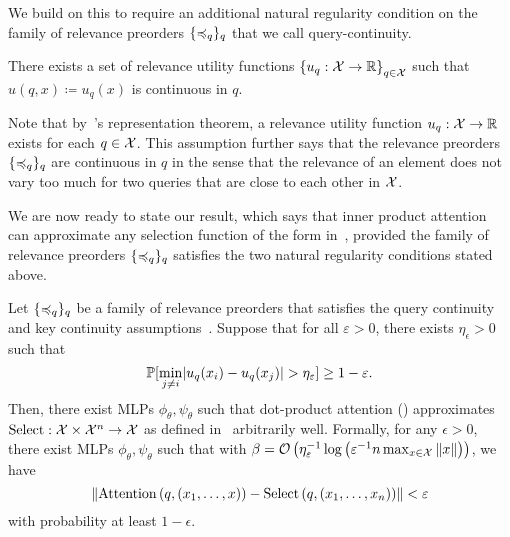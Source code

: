 We build on this to require an additional natural regularity condition on the family of relevance preorders $\{\preccurlyeq_q\}_{q}$ that we call query-continuity.

\begin{assumption}\label{ass:query_cts}
    There exists a set of relevance utility functions $\left\{u_q: {\mathcal{X}} \to \mathbb{R}\right\}_{q \in {\mathcal{X}}}$ such that $u(q, x) \coloneq u_q(x)$ is continuous in $q$.
\end{assumption}

Note that by~'s representation theorem, a relevance utility function $u_q: {\mathcal{X}} \to \mathbb{R}$ exists for each $q \in {\mathcal{X}}$. This assumption further says that the relevance preorders $\{\preccurlyeq_q\}_{q}$ are continuous in $q$ in the sense that the relevance of an element does not vary too much for two queries that are close to each other in ${\mathcal{X}}$.

We are now ready to state our result, which says that inner product attention can approximate any selection function of the form in~, provided the family of relevance preorders $\{\preccurlyeq_q\}_q$ satisfies the two natural regularity conditions stated above.

\begin{theorem}
    Let $\{\preccurlyeq_q\}_q$ be a family of relevance preorders that satisfies the query continuity and key continuity assumptions~. Suppose that for all $\varepsilon > 0$, there exists $\eta_\epsilon > 0$ such that 
    $$\mathbb{P}[\min_{j \neq i} \lvert u_q(x_i) - u_q(x_j)\rvert > \eta_\varepsilon] \geq 1 - \varepsilon.$$
    Then, there exist MLPs $\phi_\theta, \psi_\theta$ such that dot-product attention () approximates $\mathrm{Select}: {\mathcal{X}} \times {\mathcal{X}}^n \to {\mathcal{X}}$ as defined in~ arbitrarily well. Formally, for any $\epsilon > 0$, there exist MLPs $\phi_\theta, \psi_\theta$ such that with $\beta = {\mathcal{O}}\left(\eta_\varepsilon^{-1} \log\left(\varepsilon^{-1} n \max_{x \in {\mathcal{X}}} \left\lVert x\right\rVert\right)\right)$, we have
    \begin{equation*}
        \left\lVert\mathrm{Attention}\left(q, (x_1, \ldots, x)\right) - \mathrm{Select}\left(q, (x_1, \ldots, x_n)\right)\right\rVert < \varepsilon
    \end{equation*}
    with probability at least $1 - \epsilon$.
\end{theorem}

